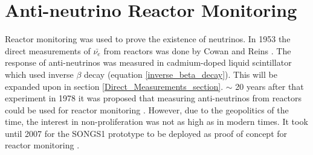 \section{Anti-neutrino Reactor Monitoring}
Reactor monitoring was used to prove the existence of neutrinos. In 1953 the direct measurements of $\bar{\nu_e}$ from reactors was done by Cowan and Reins \cite{Cowan1956Confirmation}. The response of anti-neutrinos was measured in cadmium-doped liquid scintillator \cite{Cowan1956Confirmation} which used inverse $\beta$ decay (equation \ref{inverse_beta_decay}). This will be expanded upon in section \ref{Direct_Measurements_section}. $\sim$ 20 years after that experiment in 1978 it was proposed that measuring anti-neutrinos from reactors could be used for reactor monitoring \cite{Borovoi_1978}. However, due to the geopolitics of the time, the interest in non-proliferation was not as high as in modern times. It took until 2007 for the SONGS1 prototype to be deployed as proof of concept for reactor monitoring \cite{Bowden_2007}. 
